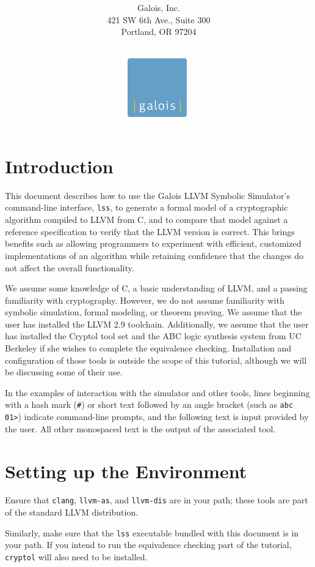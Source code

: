\documentclass[11pt]{article}
\title{\LARGE{\bf \titleline}}
\author{\\$ $\\$ $\\
        Galois, Inc.\\
        421 SW 6th Ave., Suite 300\\Portland, OR 97204}
\date{
\vspace*{2cm}$ $\\
\includegraphics[height=1in]{images/Galois_logo_blue_box.pdf}
\vspace*{2cm}$ $\\
}
\begin{document}
\maketitle
\thispagestyle{empty}
\newpage

\section{Introduction}

This document describes how to use the Galois LLVM Symbolic Simulator's
command-line interface, \texttt{lss}, to generate a formal model of a
cryptographic algorithm compiled to LLVM from C, and to compare that
model against a reference specification to verify that the LLVM version
is correct. This brings benefits such as allowing programmers to
experiment with efficient, customized implementations of an algorithm
while retaining confidence that the changes do not affect the overall
functionality.

We assume some knowledge of C, a basic understanding of LLVM, and a
passing familiarity with cryptography. However, we do not assume
familiarity with symbolic simulation, formal modeling, or theorem
proving.  We assume that the user has installed the LLVM 2.9 toolchain.
Additionally, we assume that the user has installed the Cryptol tool set
and the ABC logic synthesis system from UC Berkeley if she wishes to
complete the equivalence checking.  Installation and configuration of
those tools is outside the scope of this tutorial, although we will be
discussing some of their use.

In the examples of interaction with the simulator and other tools, lines
beginning with a hash mark (\texttt{\#}) or short text followed by an
angle bracket (such as \texttt{abc 01>}) indicate command-line prompts,
and the following text is input provided by the user. All other
monospaced text is the output of the associated tool.

\section{Setting up the Environment}
\label{sec:setup}
 
Ensure that \texttt{clang}, \texttt{llvm-as}, and \texttt{llvm-dis} are
in your path; these tools are part of the standard LLVM distribution.

Similarly, make sure that the \texttt{lss} executable bundled with this
document is in your path.  If you intend to run the equivalence checking
part of the tutorial, \texttt{cryptol} will also need to be installed.
\end{document}
